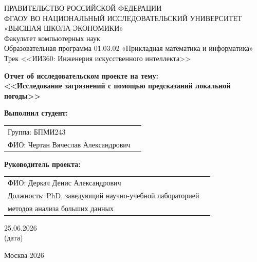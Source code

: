 \documentclass[12pt]{article}
\begin{document}
\begin{titlepage}
		\newpage
		
		{
			\begin{center}
				ПРАВИТЕЛЬСТВО РОССИЙСКОЙ ФЕДЕРАЦИИ\\
				ФГАОУ ВО НАЦИОНАЛЬНЫЙ ИССЛЕДОВАТЕЛЬСКИЙ УНИВЕРСИТЕТ\\
				«ВЫСШАЯ ШКОЛА ЭКОНОМИКИ»
				\\
				\bigskip
				Факультет компьютерных наук\\
				Образовательная программа 01.03.02 «Прикладная математика и информатика»\\
				Трек <<ИИ360: Инженерия искусственного интеллекта>>
			\end{center}
		}
		
		\vspace{2em}
		
		\begin{center}
			{\bf Отчет об исследовательском проекте на тему:}\\
			{\bf <<Исследование загрязнений с помощью предсказаний локальной погоды>>}
		\end{center}
		
		\vspace{3em}
		
		{\bf Выполнил студент:}
		
		\vspace{1em}
		
		{
			\begin{tabular}{ll}
				Группа: БПМИ243& \\
				ФИО: Чертан Вячеслав Александрович & 
		\end{tabular}}
		
		\vspace{3em}
		
		{\bf Руководитель проекта:}
		
		\vspace{1em}
		
		{
			\begin{tabular}{ll}
				ФИО: Деркач Денис Александрович & \\
				Должность: PhD, заведующий научно-учебной лабораторией \\методов анализа больших данных& 
		\end{tabular}}
	
			\vspace{7em}
		
\begin{center}
	25.06.2026 \\
	(дата)
\end{center}
		
		\vspace{\fill}
		
		\begin{center}
			Москва 2026
		\end{center}
		
	\end{titlepage}
\end{document}

